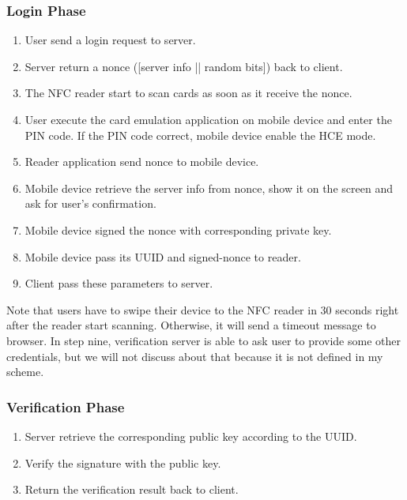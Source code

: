\begin{CJK}{Bg5}{bsmi}
\subsubsection{Login Phase}

\begin{enumerate}
\item User send a login request to server.
\item Server return a nonce ([server info || random bits]) back to client.
\item The NFC reader start to scan cards as soon as it receive the nonce.
\item User execute the card emulation application on mobile device and enter the PIN code. If the PIN code correct, mobile device enable the HCE mode.
\item Reader application send nonce to mobile device.
\item Mobile device retrieve the server info from nonce, show it on the screen and ask for user's confirmation.
\item Mobile device signed the nonce with corresponding private key.
\item Mobile device pass its UUID and signed-nonce to reader.
\item Client pass these parameters to server.
\end{enumerate}

Note that users have to swipe their device to the NFC reader in 30 seconds right after the reader start scanning. Otherwise, it will send a timeout message to browser. In step nine, verification server is able to ask user to provide some other credentials, but we will not discuss about that because it is not defined in my scheme.

\subsubsection{Verification Phase}

\begin{enumerate}
\item Server retrieve the corresponding public key according to the UUID.
\item Verify the signature with the public key.
\item Return the verification result back to client.
\end{enumerate}

\begin{comment}
\section{Scenario}


\end{comment}
\end{CJK}
